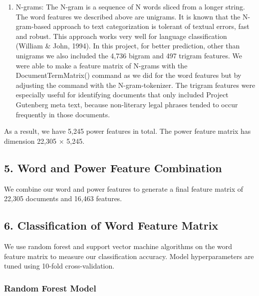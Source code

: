 \documentclass[12pt,]{article}
\begin{document}
\begin{enumerate}
\def\labelenumi{(\arabic{enumi})}
\setcounter{enumi}{2}
\itemsep1pt\parskip0pt
\item
  N-grams: The N-gram is a sequence of N words sliced from a longer
  string. The word features we described above are unigrams. It is known
  that the N-gram-based approach to text categorization is tolerant of
  textual errors, fast and robust. This approach works very well for
  language classification (William \& John, 1994). In this project, for
  better prediction, other than unigrams we also included the 4,736
  bigram and 497 trigram features. We were able to make a feature matrix
  of N-grams with the DocumentTermMatrix() command as we did for the
  word features but by adjusting the command with the N-gram-tokenizer.
  The trigram features were especially useful for identifying documents
  that only included Project Gutenberg meta text, because non-literary
  legal phrases tended to occur frequently in those documents.
\end{enumerate}

As a result, we have 5,245 power features in total. The power feature
matrix has dimension 22,305 \(\times\) 5,245.

\subsection{5. Word and Power Feature
Combination}\label{word-and-power-feature-combination}

We combine our word and power features to generate a final feature
matrix of 22,305 documents and 16,463 features.

\subsection{6. Classification of Word Feature
Matrix}\label{classification-of-word-feature-matrix}

We use random forest and support vector machine algorithms on the word
feature matrix to measure our classification accuracy. Model
hyperparameters are tuned using 10-fold cross-validation.

\subsubsection{Random Forest Model}\label{random-forest-model}
\end{document}
